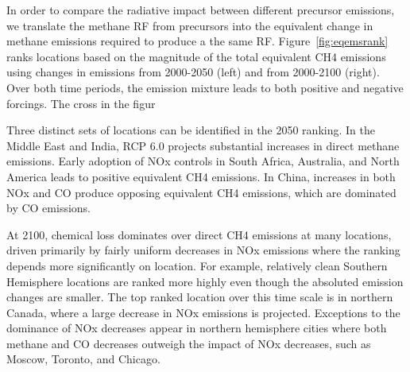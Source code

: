 In order to compare the radiative impact between different precursor emissions, we translate the methane RF from precursors into the equivalent change in methane emissions required to produce a the same RF. Figure~\ref{fig:eqemsrank} ranks locations based on the magnitude of the total equivalent CH4 emissions using changes in emissions from 2000-2050 (left) and from 2000-2100 (right). Over both time periods, the emission  mixture leads to both  positive and negative forcings. The cross in the figur

Three distinct sets of locations can be identified in the 2050 ranking. In the Middle East and India, RCP 6.0 projects substantial increases in direct methane emissions. Early adoption of NOx controls in South Africa, Australia, and North America leads to positive equivalent CH4 emissions. In China, increases in both NOx and CO produce opposing equivalent CH4 emissions, which are dominated by  CO emissions.

At 2100, chemical loss dominates over direct CH4 emissions at many locations, driven primarily by fairly uniform decreases in NOx emissions where the ranking depends more significantly on location. For example,  relatively clean Southern Hemisphere locations are ranked more highly even though the absoluted emission changes are smaller. The top ranked location over this time scale is in northern Canada, where a large decrease in NOx emissions is projected. Exceptions to the dominance of NOx decreases appear in northern hemisphere cities where both methane and CO decreases outweigh the impact of NOx decreases, such as Moscow, Toronto, and Chicago. 

